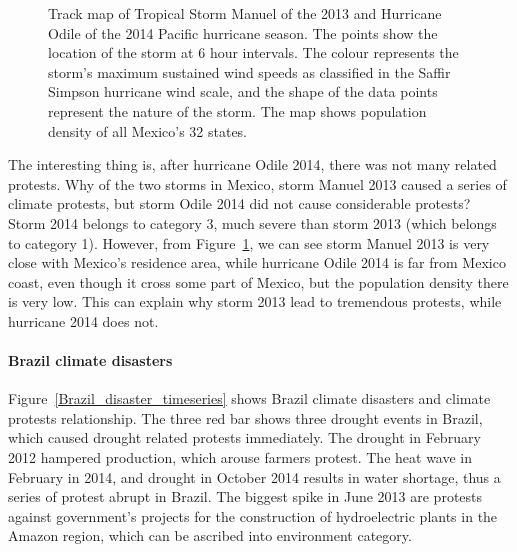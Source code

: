 \documentclass[9pt,twocolumn,twoside]{pnas-new}
\begin{document}
\begin{figure}[ht]
	\centering
	\caption{Track map of Tropical Storm Manuel of the 2013 and Hurricane Odile of the 2014 Pacific hurricane season. The points show the location of the storm at 6 hour intervals. The colour represents the storm's maximum sustained wind speeds as classified in the Saffir Simpson hurricane wind scale, and the shape of the data points represent the nature of the storm. The map shows population density of all Mexico's 32 states. }
\label{Mexico-track-map}
\end{figure}

The interesting thing is, after hurricane Odile 2014, there was not many related protests. Why of the two storms in Mexico, storm Manuel 2013 caused a series of climate protests, but storm Odile 2014 did not cause considerable protests? Storm 2014 belongs to category 3, much severe than storm 2013 (which belongs to category 1). However, from Figure~\ref{Mexico-track-map}, we can see storm Manuel 2013 is very close with Mexico's residence area, while hurricane Odile 2014 is far from Mexico coast, even though it cross some part of Mexico, but the population density there is very low. This can explain why storm 2013 lead to tremendous protests, while hurricane 2014 does not.

\paragraph{Brazil climate disasters}
Figure~\ref{Brazil_disaster_timeseries} shows Brazil climate disasters and climate protests relationship. The three red bar shows three drought events in Brazil, which caused drought related protests immediately. The drought in February 2012 hampered production, which arouse farmers protest. The heat wave in February in 2014, and drought in October 2014 results in water shortage, thus a series of protest abrupt in Brazil. The biggest spike in June 2013 are protests against government's projects for the construction of hydroelectric plants in the Amazon region, which can be ascribed into environment category.
\end{document}
